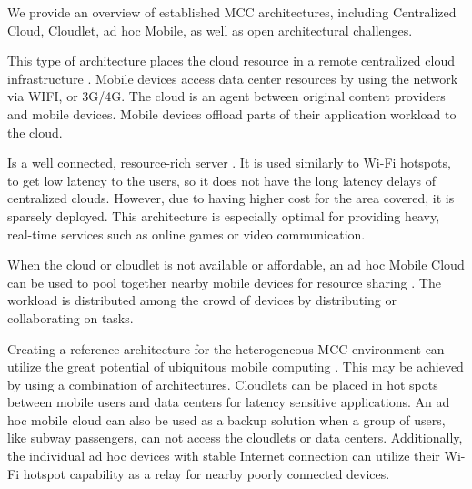 We provide an overview of established MCC architectures, including Centralized Cloud, Cloudlet, ad hoc Mobile, as well as open architectural challenges.
\begin{description}[style=nextline]
\item [Centralized Cloud]
This type of architecture places the cloud resource in a remote centralized cloud infrastructure \citep[p.3]{liu2013gearing}. Mobile devices access data center resources by using the network via WIFI, or 3G/4G. The cloud is an agent between original content providers and mobile devices. Mobile devices offload parts of their application workload to the cloud.
\item [Cloudlet]
Is a well connected, resource-rich server \citep[p.3-4]{liu2013gearing}. 
It is used similarly to Wi-Fi hotspots, to get low latency to the users, so it does not have the long latency delays of centralized clouds. 
However, due to having higher cost for the area covered, it is sparsely deployed. 
This architecture is especially optimal for providing heavy, real-time services such as online games or video communication.
\item [ad hoc Mobile Cloud]
When the cloud or cloudlet is not available or affordable, an ad hoc Mobile Cloud can be used to pool together nearby mobile devices for resource sharing \citep[p.4]{liu2013gearing}. 
The workload is distributed among the crowd of devices by distributing or collaborating on tasks.
\item [Architectural Challenges]
Creating a reference architecture for the heterogeneous MCC environment can utilize the great potential of ubiquitous mobile computing \citep{sanaei2014heterogeneity}. 
This may be achieved by using a combination of architectures. 
Cloudlets can be placed in hot spots between mobile users and data centers for latency sensitive applications. 
An ad hoc mobile cloud can also be used as a backup solution when a group of users, like subway passengers, can not access the cloudlets or data centers. 
Additionally, the individual ad hoc devices with stable Internet connection can utilize their Wi-Fi hotspot capability as a relay for nearby poorly connected devices.


\end{description}